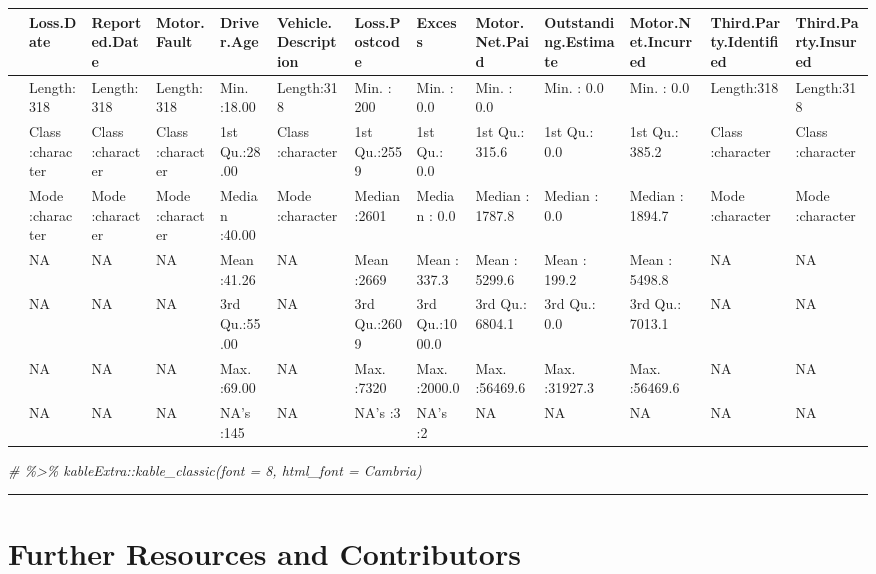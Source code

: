 \documentclass[
]{book}
\newenvironment{Shaded}{\begin{snugshade}}{\end{snugshade}}
\newcommand{\CommentTok}[1]{\textcolor[rgb]{0.56,0.35,0.01}{\textit{#1}}}
\begin{document}
\begin{tabular}{l|l|l|l|l|l|l|l|l|l|l|l|l}
\hline
  &  Loss.Date & Reported.Date & Motor.Fault &   Driver.Age & Vehicle.Description & Loss.Postcode &     Excess & Motor.Net.Paid & Outstanding.Estimate & Motor.Net.Incurred & Third.Party.Identified & Third.Party.Insured\\
\hline
 & Length:318 & Length:318 & Length:318 & Min.   :18.00 & Length:318 & Min.   : 200 & Min.   :   0.0 & Min.   :    0.0 & Min.   :    0.0 & Min.   :    0.0 & Length:318 & Length:318\\
\hline
 & Class :character & Class :character & Class :character & 1st Qu.:28.00 & Class :character & 1st Qu.:2559 & 1st Qu.:   0.0 & 1st Qu.:  315.6 & 1st Qu.:    0.0 & 1st Qu.:  385.2 & Class :character & Class :character\\
\hline
 & Mode  :character & Mode  :character & Mode  :character & Median :40.00 & Mode  :character & Median :2601 & Median :   0.0 & Median : 1787.8 & Median :    0.0 & Median : 1894.7 & Mode  :character & Mode  :character\\
\hline
 & NA & NA & NA & Mean   :41.26 & NA & Mean   :2669 & Mean   : 337.3 & Mean   : 5299.6 & Mean   :  199.2 & Mean   : 5498.8 & NA & NA\\
\hline
 & NA & NA & NA & 3rd Qu.:55.00 & NA & 3rd Qu.:2609 & 3rd Qu.:1000.0 & 3rd Qu.: 6804.1 & 3rd Qu.:    0.0 & 3rd Qu.: 7013.1 & NA & NA\\
\hline
 & NA & NA & NA & Max.   :69.00 & NA & Max.   :7320 & Max.   :2000.0 & Max.   :56469.6 & Max.   :31927.3 & Max.   :56469.6 & NA & NA\\
\hline
 & NA & NA & NA & NA's   :145 & NA & NA's   :3 & NA's   :2 & NA & NA & NA & NA & NA\\
\hline
\end{tabular}

\begin{Shaded}
\begin{Highlighting}[]
\CommentTok{\# \%\textgreater{}\% kableExtra::kable\_classic(font = 8, html\_font = \textquotesingle{}Cambria\textquotesingle{})}
\end{Highlighting}
\end{Shaded}

\begin{center}\rule{0.5\linewidth}{0.5pt}\end{center}

\hypertarget{Intro-further-reading-and-resources}{%
\section{Further Resources and Contributors}\label{Intro-further-reading-and-resources}}
\end{document}
